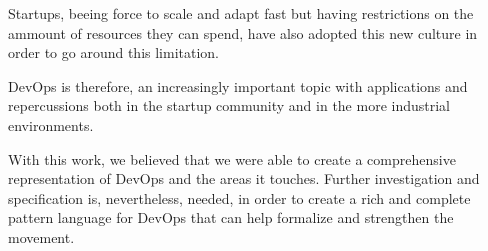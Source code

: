 \documentclass{llncs}
\begin{document}
  Startups, beeing force to scale and adapt fast but having restrictions on the ammount of resources they can spend, have also adopted this new culture in order to go around this limitation.

  DevOps is therefore, an increasingly important topic with applications and repercussions both in the startup community and in the more industrial environments.

  With this work, we believed that we were able to create a comprehensive representation of DevOps and the areas it touches. Further investigation and specification is, nevertheless, needed, in order to create a rich and complete pattern language for DevOps that can help formalize and strengthen the movement.


\end{document}
